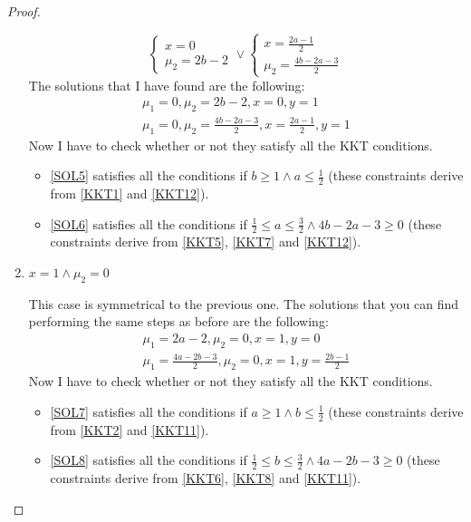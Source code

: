 \begin{proof}
\begin{enumerate}
\[\begin{cases}
                    x = 0 \\
                    \mu_2 = 2b - 2
                \end{cases}
                \lor
                \begin{cases}
                    x = \frac{2a-1}{2} \\
                    \mu_2 = \frac{4b - 2a - 3}{2}
                \end{cases}
            \]
            The solutions that I have found are the following:
            \begin{gather}
                \mu_1 = 0, \mu_2 = 2b - 2, x = 0, y = 1 \label{SOL5} \tag{SOL5} \\
                \mu_1 = 0, \mu_2 = \frac{4b - 2a - 3}{2}, x = \frac{2a - 1}{2}, y = 1 \label{SOL6} \tag{SOL6}
            \end{gather}
            Now I have to check whether or not they satisfy all the KKT conditions.
            \begin{itemize}
                \item \eqref{SOL5} satisfies all the conditions if \(b \geq 1 \land a \leq \frac{1}{2}\) (these constraints derive from \eqref{KKT1} and \eqref{KKT12}).
                \item \eqref{SOL6} satisfies all the conditions if \(\frac{1}{2} \leq a \leq \frac{3}{2} \land 4b -2a -3 \geq 0\) (these constraints derive from \eqref{KKT5}, \eqref{KKT7} and \eqref{KKT12}).
            \end{itemize}
        \item \(x = 1 \land \mu_2 = 0\)\par
            This case is symmetrical to the previous one. The solutions that you can find performing the same steps as before are the following:
            \begin{gather}
                \mu_1 = 2a - 2, \mu_2 = 0, x = 1, y = 0 \label{SOL7} \tag{SOL7} \\
                \mu_1 = \frac{4a - 2b - 3}{2}, \mu_2 = 0, x = 1, y = \frac{2b - 1}{2} \label{SOL8} \tag{SOL8}
            \end{gather}
            Now I have to check whether or not they satisfy all the KKT conditions.
            \begin{itemize}
                \item \eqref{SOL7} satisfies all the conditions if \(a \geq 1 \land b \leq \frac{1}{2}\) (these constraints derive from \eqref{KKT2} and \eqref{KKT11}).
                \item \eqref{SOL8} satisfies all the conditions if \(\frac{1}{2} \leq b \leq \frac{3}{2} \land 4a -2b -3 \geq 0\) (these constraints derive from \eqref{KKT6}, \eqref{KKT8} and \eqref{KKT11}).

\end{itemize}
\end{enumerate}
\end{proof}
